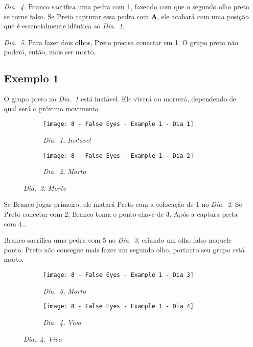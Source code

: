 \emph{Dia.\@~4.} Branco sacrifica uma pedra com 1, fazendo com que o segundo olho preto se torne falso. Se Preto capturar essa pedra com \textbf{A}, ele acabará com uma posição que é essencialmente idêntica ao \emph{Dia.\@~1}.

\emph{Dia.\@~5.} Para fazer dois olhos, Preto precisa conectar em 1. O grupo preto não poderá, então, mais ser morto.

\pagebreak

\subsection{Exemplo 1}

O grupo preto no \emph{Dia.\@~1} está instável. Ele viverá ou morrerá, dependendo de qual será o próximo movimento.

\begin{figure}[h!]
    \centering
    \begin{subfigure}[t]{.31\textwidth}
        \texttt{[image: 8 - False Eyes - Example 1 - Dia 1]}
        \caption*{\emph{Dia.\@~1. Instável}}
    \end{subfigure}
    \hspace{1cm}
    \begin{subfigure}[t]{.31\textwidth}
        \texttt{[image: 8 - False Eyes - Example 1 - Dia 2]}
        \caption*{\emph{Dia.\@~2. Morto}}
    \end{subfigure}
\end{figure}

Se Branco jogar primeiro, ele matará Preto com a colocação de 1 no \emph{Dia.\@~2}. Se Preto conectar com 2, Branco toma o ponto-chave de 3. Após a captura preta com 4\ldots

Branco sacrifica uma pedra com 5 no \emph{Dia.\@~3}, criando um olho falso naquele ponto. Preto não consegue mais fazer um segundo olho, portanto seu grupo está morto.

\begin{figure}[h!]
    \centering
    \begin{subfigure}[t]{.31\textwidth}
        \texttt{[image: 8 - False Eyes - Example 1 - Dia 3]}
        \caption*{\emph{Dia.\@~3. Morto}}
    \end{subfigure}
    \hspace{1cm}
    \begin{subfigure}[t]{.31\textwidth}
        \texttt{[image: 8 - False Eyes - Example 1 - Dia 4]}
        \caption*{\emph{Dia.\@~4. Vivo}}
    \end{subfigure}
\end{figure}

